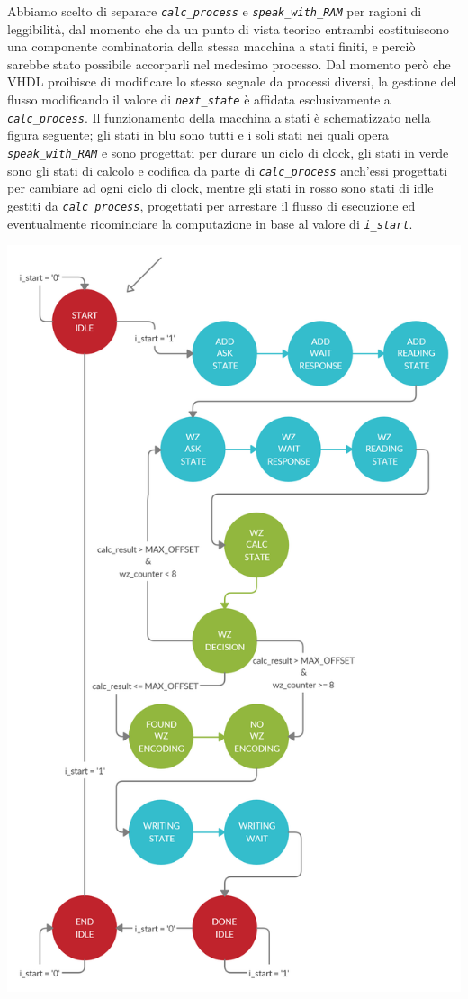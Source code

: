 \documentclass[12pt,a4paper,titlepage]{article}
\begin{document}
		Abbiamo scelto di separare \textit{\texttt{calc\_process}} e \textit{\texttt{speak\_with\_RAM}} per ragioni di leggibilità, dal momento che da un punto di vista teorico entrambi costituiscono una componente combinatoria della stessa macchina a stati finiti, e perciò sarebbe stato possibile accorparli nel medesimo processo. Dal momento però che VHDL proibisce di modificare lo stesso segnale da processi diversi, la gestione del flusso modificando il valore di \textit{\texttt{next\_state}} è affidata esclusivamente a \textit{\texttt{calc\_process}}.
		\newline
		\newline
		Il funzionamento della macchina a stati è schematizzato nella figura seguente; gli stati in blu sono tutti e i soli stati nei quali opera \textit{\texttt{speak\_with\_RAM}} e sono progettati per durare un ciclo di clock, gli stati in verde sono gli stati di calcolo e codifica da parte di \textit{\texttt{calc\_process}} anch'essi progettati per cambiare ad ogni ciclo di clock, mentre gli stati in rosso sono stati di idle gestiti da \textit{\texttt{calc\_process}}, progettati per arrestare il flusso di esecuzione ed eventualmente ricominciare la computazione in base al valore di \textit{\texttt{i\_start}}.

		\includegraphics[scale=0.275]{retlog_FSM_v1_3.png}
\end{document}
